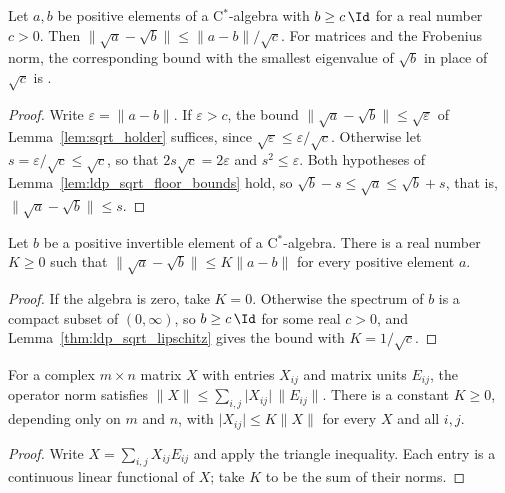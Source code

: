 \begin{lemma}
    \label{thm:ldp_sqrt_lipschitz}
    \leanok
    Let $a,b$ be positive elements of a C$^*$-algebra with $b\ge c\,\Id$ for
    a real number $c>0$. Then
    $\lVert\sqrt a-\sqrt b\rVert\le\lVert a-b\rVert/\sqrt c$.
    For matrices and the Frobenius norm, the corresponding bound with the
    smallest eigenvalue of $\sqrt b$ in place of $\sqrt c$ is
    \cite[App.~B3, eqs.~(S27)--(S31)]{Murota2026ExactLogDepth}.
\end{lemma}
\begin{proof}
    \leanok
    Write $\varepsilon=\lVert a-b\rVert$. If $\varepsilon>c$, the bound
    $\lVert\sqrt a-\sqrt b\rVert\le\sqrt\varepsilon$ of
    Lemma~\ref{lem:sqrt_holder} suffices, since
    $\sqrt\varepsilon\le\varepsilon/\sqrt c$. Otherwise let
    $s=\varepsilon/\sqrt c\le\sqrt c$, so that $2s\sqrt c=2\varepsilon$ and
    $s^2\le\varepsilon$. Both hypotheses of
    Lemma~\ref{lem:ldp_sqrt_floor_bounds} hold, so
    $\sqrt b-s\le\sqrt a\le\sqrt b+s$, that is,
    $\lVert\sqrt a-\sqrt b\rVert\le s$.
\end{proof}

\begin{lemma}
    \label{thm:ldp_sqrt_lipschitz_constant}
    \leanok
    Let $b$ be a positive invertible element of a C$^*$-algebra. There is a
    real number $K\ge0$ such that
    $\lVert\sqrt a-\sqrt b\rVert\le K\lVert a-b\rVert$ for every positive
    element $a$.
\end{lemma}
\begin{proof}
    \leanok
    If the algebra is zero, take $K=0$. Otherwise the spectrum of $b$ is a
    compact subset of $(0,\infty)$, so $b\ge c\,\Id$ for some real $c>0$, and
    Lemma~\ref{thm:ldp_sqrt_lipschitz} gives the bound with
    $K=1/\sqrt c$.
\end{proof}

\begin{lemma}
    \label{lem:perturbations_matrix_entries}
    \leanok
    For a complex $m\times n$ matrix $X$ with entries $X_{ij}$ and matrix units
    $E_{ij}$, the operator norm satisfies
    $\lVert X\rVert\le\sum_{i,j}\lvert X_{ij}\rvert\,\lVert E_{ij}\rVert$.
    There is a constant $K\ge0$, depending only on $m$ and $n$, with
    $\lvert X_{ij}\rvert\le K\lVert X\rVert$ for every $X$ and all $i,j$.
\end{lemma}
\begin{proof}
    \leanok
    Write $X=\sum_{i,j}X_{ij}E_{ij}$ and apply the triangle inequality. Each
    entry is a continuous linear functional of $X$; take $K$ to be the sum of
    their norms.
\end{proof}

